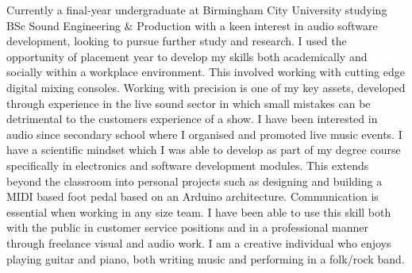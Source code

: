 \documentclass[9pt]{developercv} %
\begin{document}
\begin{minipage}[t]{1\textwidth} %
	\vspace{-\baselineskip} %
Currently a final-year undergraduate at Birmingham City University studying BSc Sound Engineering \& Production with a keen interest in audio software development, looking to pursue further study and research. I used the opportunity of placement year to develop my skills both academically and socially within a workplace environment. This involved working with cutting edge digital mixing consoles. 
\newline
\newline
Working with precision is one of my key assets, developed through experience in the live sound sector in which small mistakes can be detrimental to the customers experience of a show. I have been interested in audio since secondary school where I organised and promoted live music events.
\newline
\newline
I have a scientific mindset which I was able to develop as part of my degree course specifically in electronics and software development modules. This extends beyond the classroom into personal projects such as designing and building a MIDI based foot pedal based on an Arduino architecture.
\newline
\newline
Communication is essential when working in any size team. I have been able to use this skill both with the public in customer service positions and in a professional manner through freelance visual and audio work.
\newline
\newline
I am a creative individual who enjoys playing guitar and piano, both writing music and performing in a folk/rock band. 
\end{minipage}
\hfill %



\end{document}
